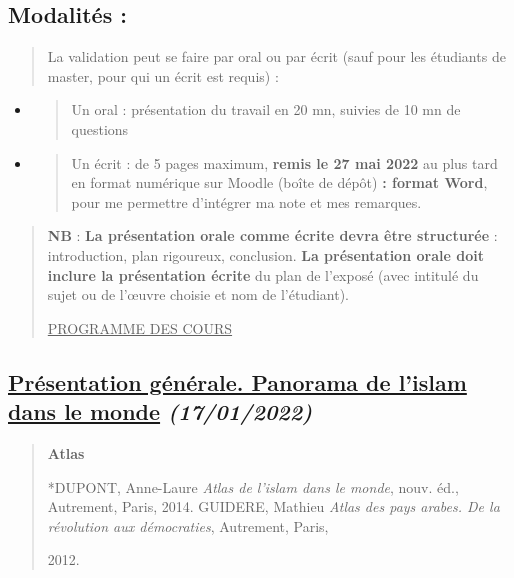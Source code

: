 \hypertarget{modalituxe9s}{%
\subsection{Modalités :}\label{modalituxe9s}}

\begin{quote}
La validation peut se faire par oral ou par écrit (sauf pour les
étudiants de master, pour qui un écrit est requis) :
\end{quote}

\begin{itemize}
\item
  \begin{quote}
  Un oral : présentation du travail en 20 mn, suivies de 10 mn de
  questions
  \end{quote}
\item
  \begin{quote}
  Un écrit : de 5 pages maximum, \textbf{remis le 27 mai 2022} au plus
  tard en format numérique sur Moodle (boîte de dépôt) \textbf{: format
  Word}, pour me permettre d'intégrer ma note et mes remarques.
  \end{quote}
\end{itemize}

\begin{quote}
\textbf{NB} : \textbf{La présentation orale comme écrite devra être
structurée} : introduction, plan rigoureux, conclusion. \textbf{La
présentation orale doit inclure la présentation écrite} du plan de
l'exposé (avec intitulé du sujet ou de l'œuvre choisie et nom de
l'étudiant).

\underline{PROGRAMME DES COURS}
\end{quote}

\hypertarget{pruxe9sentation-guxe9nuxe9rale.-panorama-de-lislam-dans-le-monde-17012022}{%
\subsection{\texorpdfstring{\underline{Présentation générale. Panorama
de l'islam dans le monde}
\emph{(17/01/2022)}}{Présentation générale. Panorama de l'islam dans le monde (17/01/2022)}}\label{pruxe9sentation-guxe9nuxe9rale.-panorama-de-lislam-dans-le-monde-17012022}}

\begin{quote}
\textbf{Atlas}

*DUPONT, Anne-Laure \emph{Atlas de l'islam dans le monde}, nouv. éd.,
Autrement, Paris, 2014. GUIDERE, Mathieu \emph{Atlas des pays arabes. De
la révolution aux démocraties}, Autrement, Paris,

2012.
\end{quote}

